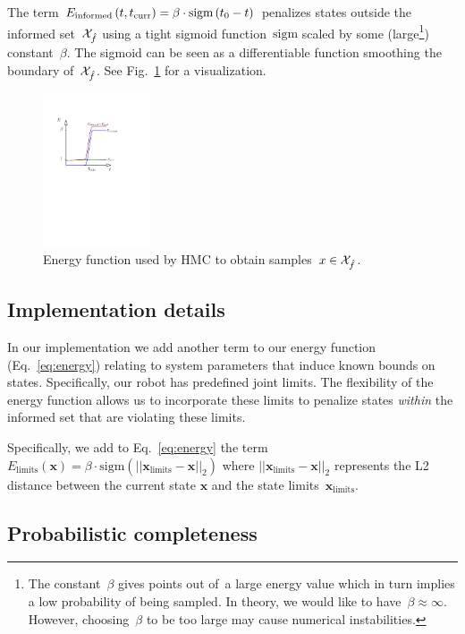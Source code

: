 \documentclass[letterpaper, 10 pt, conference]{ieeeconf}  %
\begin{document}
The term 
$E_{\text{informed}} \left( t,t_{\rm{curr}} \right) 
= \beta \cdot \text{sigm}\left(t_0 - t\right)
$
penalizes states outside the informed set~$\mathcal{X}_{\hat{f}}$ using a tight sigmoid function~$\text{sigm}$ scaled by some (large\footnote{The constant~$\beta$ gives points out of~\Cinf a large energy value which in turn implies a low probability of being sampled. In theory, we would like to have~$\beta \approx \infty$. However, choosing~$\beta$ to be too large may cause numerical instabilities.}) constant~$\beta$.
The sigmoid can be seen as a differentiable function smoothing the boundary of~$\mathcal{X}_{\hat{f}}$.
See Fig.~\ref{fig:energy} for a visualization.

\begin{figure}[tb]
  \centering
  	\includegraphics[height = 4.5cm ]{fig/energy.pdf}
  \caption{
    \captionstyle
  	Energy function used by HMC to obtain samples~$x \in \mathcal{X}_{\hat{f}}$.
  	}
   	\label{fig:energy}
\end{figure}

\subsection{Implementation details}
In our implementation we add another term to our energy function (Eq.~\ref{eq:energy}) relating to system parameters that induce known bounds on states.
Specifically, our robot has predefined joint limits. 
The flexibility of the energy function allows us to incorporate these limits  to penalize states \emph{within} the informed set that are violating these limits.

Specifically, we add to Eq.~\ref{eq:energy} the term 
$
E_{\text{limits}}\left(\mathbf{x}\right) = \beta\cdot \text{sigm} ( ||\mathbf{x}_{\text{limits}} - \mathbf{x}||_2 )
$
where $||\mathbf{x}_{\text{limits}} - \mathbf{x}||_2$ represents the L2 distance between the current state $\mathbf{x}$ and the state limits~$\mathbf{x}_{\text{limits}}$.
 

\subsection{Probabilistic completeness}
\end{document}
